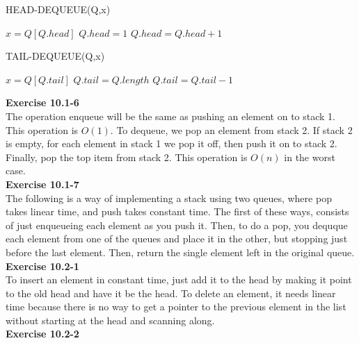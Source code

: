 \documentclass{article}
\begin{document}
\begin{algorithm}
\caption{HEAD-DEQUEUE(Q,x)}
\begin{algorithmic}
\State $x = Q[Q.head] $
\State $Q.head = 1$
\Else
\State $Q.head = Q.head+1$
\EndIf
\end{algorithmic}
\end{algorithm}

\begin{algorithm}
\caption{TAIL-DEQUEUE(Q,x)}
\begin{algorithmic}
\State $x = Q[Q.tail]$
\State $Q.tail = Q.length$
\Else
\State $Q.tail = Q.tail-1$
\EndIf
\end{algorithmic}
\end{algorithm}

\noindent\textbf{Exercise 10.1-6}\\

The operation enqueue will be the same as pushing an element on to stack 1.  This operation is $O(1)$. To dequeue, we pop an element from stack 2.  If stack 2 is empty, for each element in stack 1 we pop it off, then push it on to stack 2. Finally, pop the top item from stack 2. This operation is $O(n)$ in the worst case. \\

\noindent\textbf{ Exercise 10.1-7} \\

The following is a way of implementing a stack using two queues, where pop takes linear time, and push takes constant time. The first of these ways, consists of just enqueueing each element as you push it. Then, to do a pop, you dequque each element from one of the queues and place it in the other, but stopping just before the last element. Then, return the single element left in the original queue.\\



\noindent\textbf{ Exercise 10.2-1} \\

To insert an element in constant time, just add it to the head by making it point to the old head and have it be the head. To delete an element, it needs linear time because there is no way to get a pointer to the previous element in the list without starting at the head and scanning along.\\

\noindent\textbf{Exercise 10.2-2}\\
\end{document}
